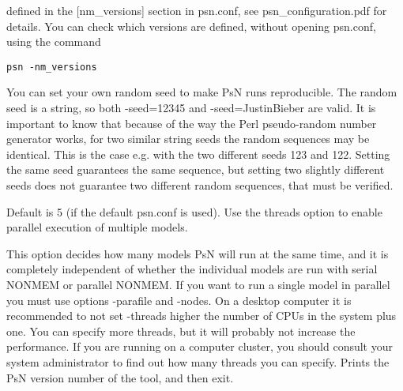 \begin{optionlist}
defined in the [nm\_versions] section in psn.conf, see psn\_configuration.pdf for details. You can check which versions are defined, without opening psn.conf, using the command

\begin{verbatim}
psn -nm_versions
\end{verbatim}
\nextopt
{}
You can set your own random seed to make PsN runs reproducible. The random seed is a string, so both -seed=12345 and -seed=JustinBieber are valid. It is important to know that because of the way the Perl pseudo-random number generator works, for two similar string seeds the random sequences may be identical. This is the case e.g. with the two different seeds 123 and 122. 
Setting the same seed guarantees the same sequence, but setting two slightly different seeds does not guarantee two different random sequences, that must be verified.
\nextopt


Default is 5 (if the default psn.conf is used). Use the threads option to enable parallel execution of multiple models.

This option decides how many models PsN will run at the same time, and it is completely independent of whether the individual models are run with serial NONMEM or parallel NONMEM. If you want to run a single model in parallel you must use options -parafile and -nodes. On a desktop computer it is recommended to not set -threads higher the number of CPUs in the system plus one. 
You can specify more threads, but it will probably not increase the performance. If you are running on a computer cluster, you should consult your system administrator to find out how many threads you can specify. 
\nextopt
{}
Prints the PsN version number of the tool, and then exit. 
\nextopt
\end{optionlist}
